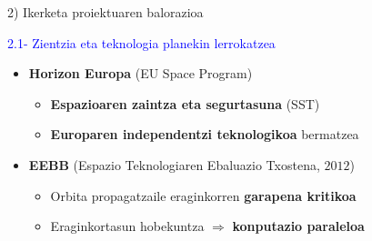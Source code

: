 \documentclass[
 10pt,%
 compress,%
 t,       %
 xcolor=svgnames
]{beamer}
\theoremstyle{definition} \newtheorem{definicion}{Definicion}[section]
\theoremstyle{propiedades} \newtheorem{propiedades}{Propiedades}[section]
\begin{document}
\begin{frame}{2) Ikerketa proiektuaren balorazioa}



%

\textcolor{blue}{2.1- Zientzia eta teknologia planekin lerrokatzea} 

\medskip
\small

\begin{itemize}
	
	
	
	\medskip
	\item \textbf{Horizon Europa} (EU Space Program)%
	
	\medskip
	\begin{itemize}
		\item \textbf{Espazioaren zaintza eta segurtasuna} (SST)
		\item \textbf{Europaren independentzi teknologikoa} bermatzea
	\end{itemize}
	
	\medskip
	
	\item \textbf{EEBB} (Espazio Teknologiaren Ebaluazio Txostena, $2012$)
	
	\medskip
	\begin{itemize}
		\item Orbita propagatzaile  eraginkorren \textbf{garapena kritikoa} %
		
		\item Eraginkortasun hobekuntza $\Rightarrow$ \textbf{konputazio paraleloa} %
		
		
	\end{itemize}


\medskip


\end{itemize}
\end{frame}
\end{document}
